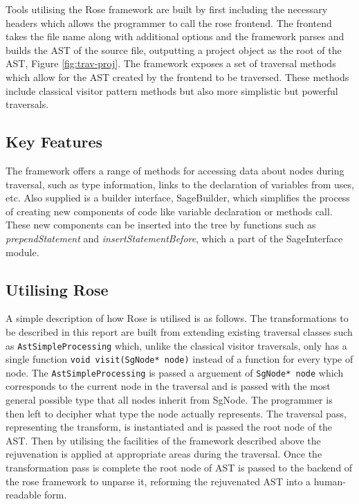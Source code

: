 \documentclass[bsc,frontabs,singlespacing,parskip,deptreport]{infthesis}
\begin{document}
Tools utilising the Rose framework are built by first including the necessary headers which allows the programmer to call the rose frontend. The frontend takes the file name along with additional options and the framework parses and builds the AST of the source file, outputting a project object as the root of the AST, Figure \ref{fig:trav-proj}. The framework exposes a set of traversal methods which allow for the AST created by the frontend to be traversed. These methods include classical visitor pattern methods but also more simplistic but powerful traversals. 

\subsection{Key Features}

The framework offers a range of methods for accessing data about nodes during traversal, such as type information, links to the declaration of variables from uses, etc. Also supplied is a builder interface, SageBuilder, which simplifies the process of creating new components of code like variable declaration or methods call. These new components can be inserted into the tree by functions such as \textit{prependStatement} and \textit{insertStatementBefore}, which a part of the SageInterface module. 

\subsection{Utilising Rose} \label{UTIL_ROSE}

A simple description of how Rose is utilised is as follows. The transformations to be described in this report are built from extending existing traversal classes such as  \texttt{AstSimpleProcessing} \cite{ROSE_MANUAL} which, unlike the classical visitor traversals, only has a single function \texttt{void visit(SgNode* node)} instead of a function for every type of node. The \texttt{AstSimpleProcessing} is passed a arguement of \texttt{SgNode* node} which corresponds to the current node in the traversal and is passed with the most general possible type that all nodes inherit from SgNode. The programmer is then left to decipher what type the node actually represents. The traversal pass, representing the transform, is instantiated and is passed the root node of the AST. Then by utilising the facilities of the framework described above the rejuvenation is applied at appropriate areas during the traversal. Once the transformation pass is complete the root node of AST is passed to the backend of the rose framework to unparse it, reforming the rejuvenated AST into a human-readable form.    
\end{document}

